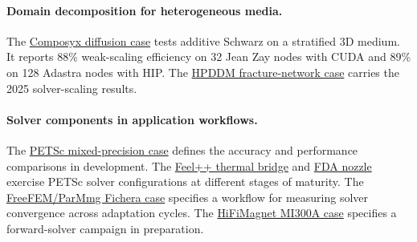 \paragraph{Domain decomposition for heterogeneous media.}
The \hyperref[sec:app:specs:app-composyx-diffusion]{Composyx diffusion case}
tests additive Schwarz on a stratified 3D medium. It reports 88\% weak-scaling
efficiency on 32 Jean Zay nodes with CUDA and 89\% on 128 Adastra nodes
with HIP. The \hyperref[sec:app:specs:app-hpddm-dfn]{HPDDM fracture-network
case} carries the 2025 solver-scaling results.

\paragraph{Solver components in application workflows.}
The \hyperref[sec:app:specs:app-petsc-mixed-precision]{PETSc mixed-precision
case} defines the accuracy and performance comparisons in development.
The \hyperref[sec:app:specs:app-feelpp-discr-1]{Feel++ thermal bridge} and
\hyperref[sec:app:specs:app-feelpp-discr-2]{FDA nozzle} exercise PETSc solver
configurations at different stages of maturity. The
\hyperref[sec:app:specs:app-freefem-parmmg]{FreeFEM/ParMmg Fichera case}
specifies a workflow for measuring solver convergence across adaptation
cycles. The \hyperref[sec:app:specs:app-feelpp-mi300a-fem]{HiFiMagnet
MI300A case} specifies a forward-solver campaign in preparation.

